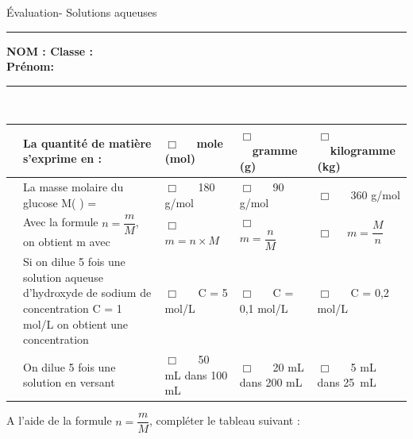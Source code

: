 \documentclass[11pt,a4paper]{article}
\begin{document}
\noindent

\begin{center}
\LARGE{Évaluation- Solutions aqueuses}\\[8mm]
\end{center}
\normalsize
\hrule 


\flushleft \textbf{NOM : \hfill Classe : \hspace{3cm} ~~\\[2mm]
Prénom:\\[0,4cm]
}
\hrule\
\\[0,2cm]

\vspace {8 mm}




    \begin{tabular}{p{2mm} p{5.5cm}|C{3cm}|C{3cm}|C{3cm}}
    

         & La quantité de matière s'exprime en  :& $\Box $ ~~mole (mol) & $\Box $ ~~gramme (g)   & $\Box $ ~~kilogramme (kg) \\
         \hline
       & La masse molaire du glucose M( ) =   & $\Box $ ~~ 180 g/mol  & $\Box $ ~~ 90 g/mol   & $\Box $ ~~ 360 g/mol  \\
        \hline
          & Avec la formule $n=\dfrac{m}{M}$, on obtient m avec  &$\Box $ ~~ $m=n \times M$  &$\Box $ ~~ $m=\dfrac{n}{M}$  & $\Box $ ~~$m=\dfrac{M}{n}$   \\
         \hline
          & Si on dilue 5 fois une solution aqueuse d'hydroxyde de sodium de concentration C = 1 mol/L on obtient une concentration  &$\Box $ ~~  C = 5 mol/L  &$\Box $ ~~  C = 0,1 mol/L & $\Box $ ~~ C = 0,2 mol/L \\

         \hline
         
         & On dilue 5 fois une solution en versant  &$\Box $ ~~ 50 mL dans 100 mL  & $\Box $ ~~ 20 mL dans 200 mL  & $\Box $ ~~ 5 mL dans 25~mL \\

 
        
         \end{tabular}

        
\vspace{3mm}



A l'aide de la formule $n=\dfrac{m}{M}$, compléter le tableau suivant : 
\end{document}
